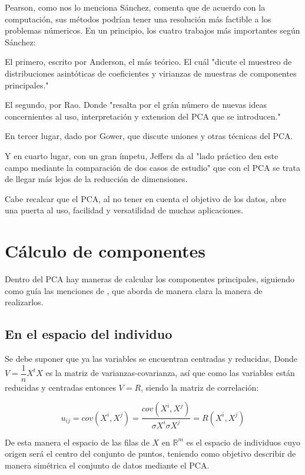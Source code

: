 Pearson, como nos lo menciona Sánchez, comenta que de acuerdo con la computación, sus métodos podrían tener una resolución más factible a los problemas númericos.
En un principio, los cuatro trabajos más importantes según Sánchez:

El primero, escrito por Anderson, el más teórico. El cuál "dicute el muestreo de distribuciones asintóticas de coeficientes y virianzas de muestras de componentes principales." \cite{andresSanchesMangas}

El segundo, por Rao. Donde "resalta por el grán número de nuevas ideas concernientes al uso, interpretación y extension del PCA que se introducen." \cite{andresSanchesMangas}

En tercer lugar, dado por Gower, que discute uniones y otras técnicas del PCA.

Y en cuarto lugar, con un gran ímpetu, Jeffers da al "lado práctico den este campo mediante la comparación de dos casos de estudio"\cite{andresSanchesMangas} que con el PCA se trata de llegar más lejos de la reducción de dimensiones.

Cabe recalcar que el PCA, al no tener en cuenta el objetivo de los datos, abre una puerta al uso, facilidad y versatilidad de muchas aplicaciones.


\section{Cálculo de componentes}

Dentro del PCA hay maneras de calcular los componentes principales, siguiendo como guía las menciones de \cite{rojas2009analisis}, que aborda de manera clara la manera de realizarlos.

\subsection{En el espacio del individuo}

Se debe suponer que ya las variables se encuentran centradas y reducidas, Donde $V=\dfrac{1}{n}X^t X$ es la matriz de varianzas-covarianza, así que como las variables están reducidas y centradas entonces $V=R$, siendo la matriz de correlación:

$$ u_{ij}=cov(X^i , X^j)=\dfrac{cov(X^i , X^j)}{\sigma X^i \sigma X^j}=R(X^i , X^j)$$

De esta manera el espacio de las filas de $X$ en $\mathbb{R}^m$ es el espacio de individuos cuyo origen será el centro del conjunto de puntos, teniendo como objetivo describir de manera simétrica el conjunto de datos mediante el PCA.

